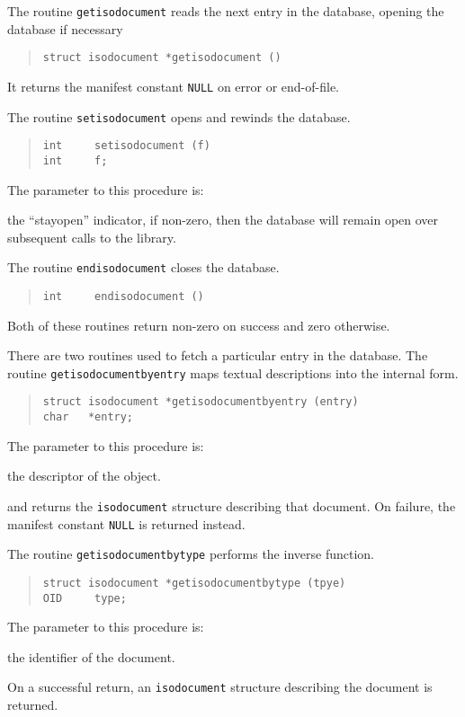 The routine \verb"getisodocument" reads the next entry in the database,
opening the database if necessary
\begin{quote}\small\begin{verbatim}
struct isodocument *getisodocument ()
\end{verbatim}\end{quote}
It returns the manifest constant \verb"NULL" on error or end-of-file.

The routine \verb"setisodocument" opens and rewinds the database.
\begin{quote}\small\begin{verbatim}
int     setisodocument (f)
int     f;
\end{verbatim}\end{quote}
The parameter to this procedure is:
\begin{describe}
\item[\verb"f":] the ``stayopen'' indicator,
if non-zero, then the database will remain open over subsequent calls to the
library.
\end{describe}
The routine \verb"endisodocument" closes the database.
\begin{quote}\small\begin{verbatim}
int     endisodocument ()
\end{verbatim}\end{quote}
Both of these routines return non-zero on success and zero otherwise.

There are two routines used to fetch a particular entry in the database.
The routine \verb"getisodocumentbyentry" maps textual descriptions into
the internal form.
\begin{quote}\small\begin{verbatim}
struct isodocument *getisodocumentbyentry (entry)
char   *entry;
\end{verbatim}\end{quote}
The parameter to this procedure is:
\begin{describe}
\item[\verb"entry":] the descriptor of the object.
\end{describe}
and returns the \verb"isodocument" structure describing that document.
On failure, the manifest constant \verb"NULL" is returned instead.

The routine \verb"getisodocumentbytype" performs the inverse function.
\begin{quote}\small\begin{verbatim}
struct isodocument *getisodocumentbytype (tpye)
OID     type;
\end{verbatim}\end{quote}
The parameter to this procedure is:
\begin{describe}
\item[\verb"type":] the identifier of the document.
\end{describe}
On a successful return,
an \verb"isodocument" structure describing the document is returned.
